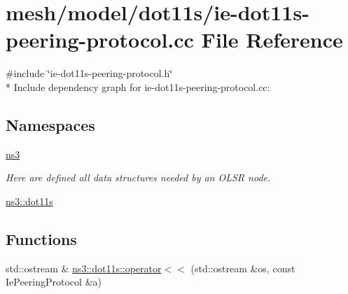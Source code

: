 \hypertarget{ie-dot11s-peering-protocol_8cc}{}\section{mesh/model/dot11s/ie-\/dot11s-\/peering-\/protocol.cc File Reference}
\label{ie-dot11s-peering-protocol_8cc}
{\ttfamily \#include \char`\"{}ie-\/dot11s-\/peering-\/protocol.\+h\char`\"{}}\\*
Include dependency graph for ie-\/dot11s-\/peering-\/protocol.cc\+:
\subsection*{Namespaces}
\begin{DoxyCompactItemize}
\item 
 \hyperlink{namespacens3}{ns3}
\begin{DoxyCompactList}\small\item\em Here are defined all data structures needed by an O\+L\+SR node. \end{DoxyCompactList}\item 
 \hyperlink{namespacens3_1_1dot11s}{ns3\+::dot11s}
\end{DoxyCompactItemize}
\subsection*{Functions}
\begin{DoxyCompactItemize}
\item 
std\+::ostream \& \hyperlink{namespacens3_1_1dot11s_a9d76f1596aa3354e1eeda8ddad0a5ac7}{ns3\+::dot11s\+::operator$<$$<$} (std\+::ostream \&os, const Ie\+Peering\+Protocol \&a)
\end{DoxyCompactItemize}
